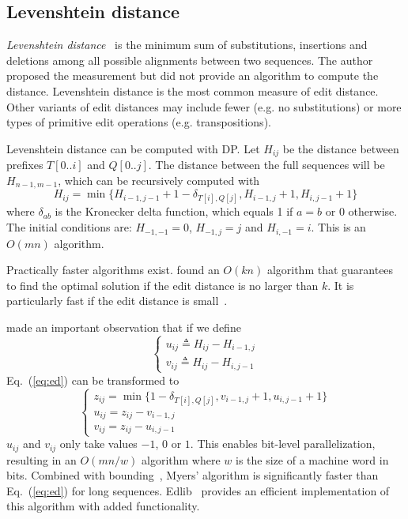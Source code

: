 \documentclass{bioinfo}
\begin{document}
\subsection{Levenshtein distance}

\emph{Levenshtein distance}~\citep{Levenshtein:1966aa} is the minimum sum of
substitutions, insertions and deletions among all possible alignments between
two sequences. The author proposed the measurement but did not provide an
algorithm to compute the distance. Levenshtein distance is the most common
measure of edit distance. Other variants of edit distances may include fewer
(e.g. no substitutions) or more types of primitive edit operations (e.g.
transpositions).

Levenshtein distance can be computed with DP. Let $H_{ij}$ be the distance
between prefixes $T[0..i]$ and $Q[0..j]$. The distance between the full
sequences will be $H_{n-1,m-1}$, which can be recursively computed with
\begin{equation}\label{eq:ed}
H_{ij}=\min\{H_{i-1,j-1}+1-\delta_{T[i],Q[j]}, H_{i-1,j}+1, H_{i,j-1}+1\}
\end{equation}
where $\delta_{ab}$ is the Kronecker delta function, which equals 1 if $a=b$ or
0 otherwise. The initial conditions are: $H_{-1,-1}=0$, $H_{-1,j}=j$ and
$H_{i,-1}=i$. This is an $O(mn)$ algorithm.

Practically faster algorithms exist. \citet{Landau:1986aa} found an $O(kn)$
algorithm that guarantees to find the optimal solution if the edit distance is
no larger than $k$. It is particularly fast if the edit distance is
small~\citep{Sosic:2015aa}.

\citet{Myers:1999aa} made an important observation that if we define
\[\left\{\begin{array}{l}
u_{ij}\triangleq H_{ij}-H_{i-1,j}\\
v_{ij}\triangleq H_{ij}-H_{i,j-1}
\end{array}\right.\]
Eq.~(\ref{eq:ed}) can be transformed to
\begin{equation}
\left\{\begin{array}{l}
z_{ij}=\min\{1-\delta_{T[i],Q[j]},v_{i-1,j}+1,u_{i,j-1}+1\}\\
u_{ij}=z_{ij}-v_{i-1,j}\\
v_{ij}=z_{ij}-u_{i,j-1}
\end{array}\right.
\end{equation}
$u_{ij}$ and $v_{ij}$ only take values $-1$, $0$ or $1$. This enables bit-level
parallelization, resulting in an $O(mn/w)$ algorithm where $w$ is the size of a
machine word in bits. Combined with bounding~\citep{Ukkonen:1985aa}, Myers'
algorithm is significantly faster than Eq.~(\ref{eq:ed}) for long sequences.
Edlib~\citep{Sosic:2017aa} provides an efficient implementation of this
algorithm with added functionality.
\end{document}
